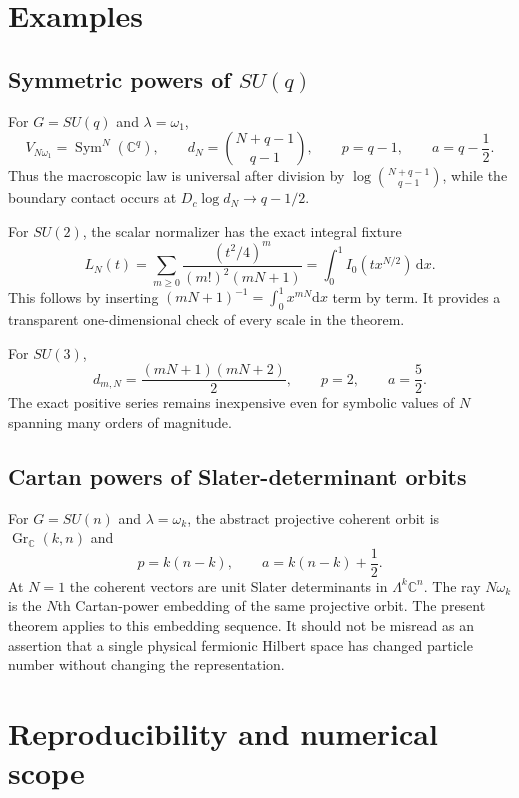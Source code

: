 \documentclass[11pt]{article}
\newcommand{\C}{\mathbb C}
\newcommand{\dd}{\mathrm d}
\begin{document}
\section{Examples}

\subsection{Symmetric powers of \texorpdfstring{$SU(q)$}{SU(q)}}

For $G=SU(q)$ and $\lambda=\omega_1$,
\[
 V_{N\omega_1}=\operatorname{Sym}^N(\C^q),
 \qquad d_N=\binom{N+q-1}{q-1},
 \qquad p=q-1,
 \qquad a=q-\frac12.
\]
Thus the macroscopic law is universal after division by
$\log\binom{N+q-1}{q-1}$, while the boundary contact occurs at
$D_c\log d_N\to q-1/2$.

For $SU(2)$, the scalar normalizer has the exact integral fixture
\[
 L_N(t)=\sum_{m\ge0}\frac{(t^2/4)^m}{(m!)^2(mN+1)}
 =\int_0^1 I_0(t x^{N/2})\,\dd x.                       \label{eq:SU2}
\]
This follows by inserting
$(mN+1)^{-1}=\int_0^1x^{mN}\dd x$ term by term.  It provides a transparent
one-dimensional check of every scale in the theorem.

For $SU(3)$,
\[
 d_{m,N}=\frac{(mN+1)(mN+2)}2,
 \qquad p=2,
 \qquad a=\frac52.
\]
The exact positive series remains inexpensive even for symbolic values of
$N$ spanning many orders of magnitude.

\subsection{Cartan powers of Slater-determinant orbits}

For $G=SU(n)$ and $\lambda=\omega_k$, the abstract projective coherent orbit
is $\operatorname{Gr}_{\C}(k,n)$ and
\[
 p=k(n-k),\qquad a=k(n-k)+\frac12.
\]
At $N=1$ the coherent vectors are unit Slater determinants in
$\Lambda^k\C^n$.  The ray $N\omega_k$ is the $N$th Cartan-power embedding of
the same projective orbit.  The present theorem applies to this embedding
sequence.  It should not be misread as an assertion that a single physical
fermionic Hilbert space has changed particle number without changing the
representation.

\section{Reproducibility and numerical scope}
\end{document}
